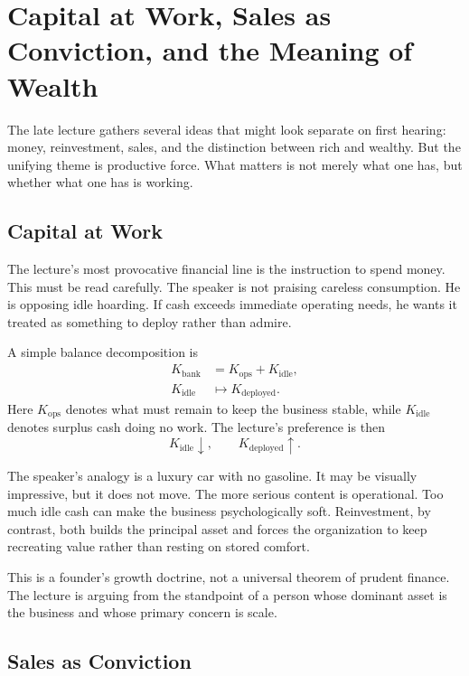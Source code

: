 \section{Capital at Work, Sales as Conviction, and the Meaning of Wealth}

The late lecture gathers several ideas that might look separate on first hearing: money, reinvestment, sales, and the distinction between rich and wealthy. But the unifying theme is productive force. What matters is not merely what one has, but whether what one has is working.

\subsection{Capital at Work}

The lecture's most provocative financial line is the instruction to spend money. This must be read carefully. The speaker is not praising careless consumption. He is opposing idle hoarding. If cash exceeds immediate operating needs, he wants it treated as something to deploy rather than admire.

A simple balance decomposition is
\begin{align}
K_{\text{bank}} &= K_{\text{ops}} + K_{\text{idle}},\\
K_{\text{idle}} &\mapsto K_{\text{deployed}}.
\end{align}
Here \(K_{\text{ops}}\) denotes what must remain to keep the business stable, while \(K_{\text{idle}}\) denotes surplus cash doing no work. The lecture's preference is then
\begin{equation}
K_{\text{idle}}\downarrow,\qquad K_{\text{deployed}}\uparrow.
\end{equation}

The speaker's analogy is a luxury car with no gasoline. It may be visually impressive, but it does not move. The more serious content is operational. Too much idle cash can make the business psychologically soft. Reinvestment, by contrast, both builds the principal asset and forces the organization to keep recreating value rather than resting on stored comfort.

\begin{remark}
This is a founder's growth doctrine, not a universal theorem of prudent finance. The lecture is arguing from the standpoint of a person whose dominant asset is the business and whose primary concern is scale.
\end{remark}

\subsection{Sales as Conviction}

